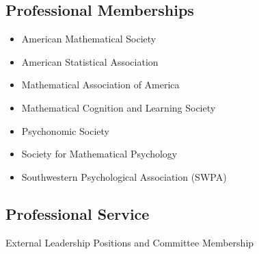 \documentclass[article,10pt]{article}
\begin{document}
\subsection*{Professional Memberships}
\label{sec:org687a629}
\begin{itemize}
\item American Mathematical Society
\item American Statistical Association
\item Mathematical Association of America
\item Mathematical Cognition and Learning Society
\item Psychonomic Society
\item Society for Mathematical Psychology
\item Southwestern Psychological Association (SWPA)
\end{itemize}

\subsection*{Professional Service}
\label{sec:org0d3427a}

External Leadership Positions and Committee Membership
\end{document}
